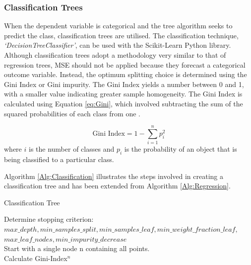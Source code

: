 \documentclass[../thesis.tex]{subfiles}
\begin{document}
\subsubsection{Classification Trees}
When the dependent variable is categorical and the tree algorithm seeks to predict the class, classification trees are utilised. The classification technique, \textit{`DecisionTreeClassifier'}, can be used with the Scikit-Learn \cite{Pedregosa2011} Python library. Although classification trees adopt a methodology very similar to that of regression trees, MSE should not be applied because they forecast a categorical outcome variable. Instead, the optimum splitting choice is determined using the Gini Index or Gini impurity. The Gini Index yields a number between 0 and 1, with a smaller value indicating greater sample homogeneity. The Gini Index is calculated using Equation \eqref{eq:Gini}, which involved subtracting the sum of the squared probabilities of each class from one \cite{Das2020}.

\begin{equation}\label{eq:Gini}
    \text{Gini Index} = 1 - \sum_{i=1}^{n}p_{i}^{2}
\end{equation}
where $i$ is the number of classes and $p_{i}$ is the probability of an object that is being classified to a particular class.

Algorithm \ref{Alg:Classification} illustrates the steps involved in creating a classification tree and has been extended from Algorithm \ref{Alg:Regression}.
\begin{algorithm}
\caption{Classification Tree}\label{Alg:Classification}
Determine stopping criterion:\\ $max\_depth, min\_samples\_split, min\_samples\_leaf, min\_weight\_fraction\_leaf,$\\$ max\_leaf\_nodes, min\_impurity\_decrease$\\
Start with a single node n containing all points. \\
Calculate Gini-Index$^{n}$\\
\end{algorithm}
\end{document}
